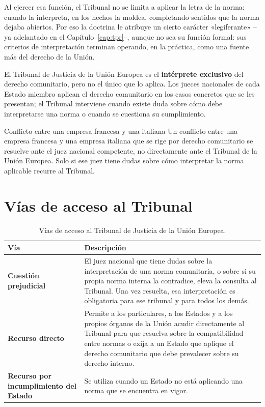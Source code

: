 \documentclass[12pt,oneside]{book}
\begin{document}
Al ejercer esa función, el Tribunal no se limita a aplicar la letra de la norma: cuando la interpreta, en los hechos la moldea, completando sentidos que la norma dejaba abiertos. Por eso la doctrina le atribuye un cierto carácter «legiferante» --ya adelantado en el Capítulo~\ref{cap:tpr}--, aunque no sea su función formal: sus criterios de interpretación terminan operando, en la práctica, como una fuente más del derecho de la Unión.

\begin{importante}
El Tribunal de Justicia de la Unión Europea es el \textbf{intérprete exclusivo} del derecho comunitario, pero no el único que lo aplica. Los jueces nacionales de cada Estado miembro aplican el derecho comunitario en los casos concretos que se les presentan; el Tribunal interviene cuando existe duda sobre cómo debe interpretarse una norma o cuando se cuestiona su cumplimiento.
\end{importante}

\begin{ejemplo}{Conflicto entre una empresa francesa y una italiana}
Un conflicto entre una empresa francesa y una empresa italiana que se rige por derecho comunitario se resuelve ante el juez nacional competente, no directamente ante el Tribunal de la Unión Europea. Solo si ese juez tiene dudas sobre cómo interpretar la norma aplicable recurre al Tribunal.
\end{ejemplo}

\section{Vías de acceso al Tribunal}

\begin{table}[H]
\centering
\renewcommand{\arraystretch}{1.25}
\begin{tabularx}{\textwidth}{>{\raggedright\arraybackslash}p{}>{\raggedright\arraybackslash}X}
\toprule
\textbf{Vía} & \textbf{Descripción} \\
\midrule
\textbf{Cuestión prejudicial} & El juez nacional que tiene dudas sobre la interpretación de una norma comunitaria, o sobre si su propia norma interna la contradice, eleva la consulta al Tribunal. Una vez resuelta, esa interpretación es obligatoria para ese tribunal y para todos los demás. \\
\textbf{Recurso directo} & Permite a los particulares, a los Estados y a los propios órganos de la Unión acudir directamente al Tribunal para que resuelva sobre la compatibilidad entre normas o exija a un Estado que aplique el derecho comunitario que debe prevalecer sobre su derecho interno. \\
\textbf{Recurso por incumplimiento del Estado} & Se utiliza cuando un Estado no está aplicando una norma que se encuentra en vigor. \\
\bottomrule
\end{tabularx}
\caption{Vías de acceso al Tribunal de Justicia de la Unión Europea.}
\end{table}
\end{document}
